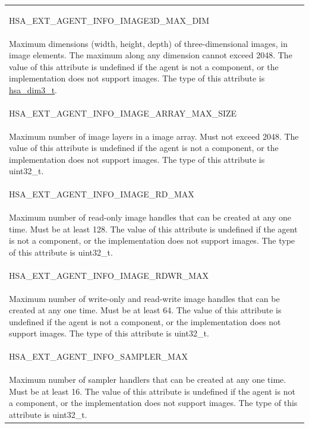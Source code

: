 \documentclass[final]{book}
\newcommand{\reftyp}[1]{#1}
\newcommand{\refenu}[1]{\reftyp{#1}}
\begin{document}
\begin{longtable}{@{\hspace{2em}}p{\linewidth-2em}}
\hspace{-2em}\hypertarget{group__agentinfo_1gga39d0684207d95717d96319573b3e4a42ac7e605dad393b6f73722cb5c86a968e1}{\refenu{HSA_\-EXT_\-AGENT_\-INFO_\-IMAGE3D_\-MAX_\-DIM}} \\Maximum dimensions (width, height, depth) of three-dimensional images, in image elements. The maximum along any dimension cannot exceed 2048. The value of this attribute is undefined if the agent is not a component, or the implementation does not support images. The type of this attribute is \hyperlink{group__common_1ga6f7883588491965c45382cd996351aa2}{hsa_\-dim3_\-t}.\\[2mm]
\hspace{-2em}\hypertarget{group__agentinfo_1gga39d0684207d95717d96319573b3e4a42aeb37004b5bac60cd22b069dde35888f9}{\refenu{HSA_\-EXT_\-AGENT_\-INFO_\-IMAGE_\-ARRAY_\-MAX_\-SIZE}} \\Maximum number of image layers in a image array. Must not exceed 2048. The value of this attribute is undefined if the agent is not a component, or the implementation does not support images. The type of this attribute is uint32_\-t.\\[2mm]
\hspace{-2em}\hypertarget{group__agentinfo_1gga39d0684207d95717d96319573b3e4a42a1aeb019ae81f2f942f27b674ed88168d}{\refenu{HSA_\-EXT_\-AGENT_\-INFO_\-IMAGE_\-RD_\-MAX}} \\Maximum number of read-only image handles that can be created at any one time. Must be at least 128. The value of this attribute is undefined if the agent is not a component, or the implementation does not support images. The type of this attribute is uint32_\-t.\\[2mm]
\hspace{-2em}\hypertarget{group__agentinfo_1gga39d0684207d95717d96319573b3e4a42a7e87348657b922b54b85bfdda6983fda}{\refenu{HSA_\-EXT_\-AGENT_\-INFO_\-IMAGE_\-RDWR_\-MAX}} \\Maximum number of write-only and read-write image handles that can be created at any one time. Must be at least 64. The value of this attribute is undefined if the agent is not a component, or the implementation does not support images. The type of this attribute is uint32_\-t.\\[2mm]
\hspace{-2em}\hypertarget{group__agentinfo_1gga39d0684207d95717d96319573b3e4a42a3fe5f472b5a75eba3669a5488b2206ae}{\refenu{HSA_\-EXT_\-AGENT_\-INFO_\-SAMPLER_\-MAX}} \\Maximum number of sampler handlers that can be created at any one time. Must be at least 16. The value of this attribute is undefined if the agent is not a component, or the implementation does not support images. The type of this attribute is uint32_\-t.
\end{longtable}
\end{document}

